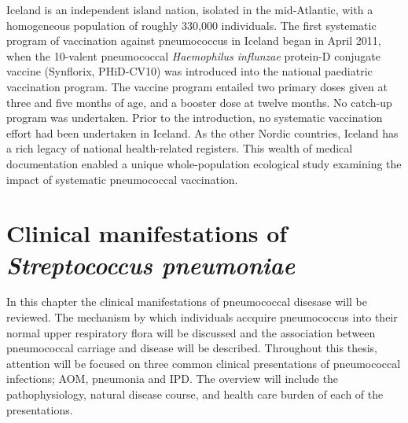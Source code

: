 \documentclass[]{book}
\theoremstyle{definition}
\theoremstyle{definition}
\theoremstyle{definition}
\theoremstyle{remark}
\begin{document}
Iceland is an independent island nation, isolated in the mid-Atlantic,
with a homogeneous population of roughly 330,000 individuals. The first
systematic program of vaccination against pneumococcus in Iceland began
in April 2011, when the 10-valent pneumococcal \emph{Haemophilus
influnzae} protein-D conjugate vaccine (Synflorix, PHiD-CV10) was
introduced into the national paediatric vaccination program. The vaccine
program entailed two primary doses given at three and five months of
age, and a booster dose at twelve months. No catch-up program was
undertaken. Prior to the introduction, no systematic vaccination effort
had been undertaken in Iceland. As the other Nordic countries, Iceland
has a rich legacy of national health-related registers. This wealth of
medical documentation enabled a unique whole-population ecological study
examining the impact of systematic pneumococcal vaccination.

\section{\texorpdfstring{Clinical manifestations of \emph{Streptococcus
pneumoniae}}{Clinical manifestations of Streptococcus pneumoniae}}\label{clinical-manifestations-of-streptococcus-pneumoniae}

In this chapter the clinical manifestations of pneumococcal disesase
will be reviewed. The mechanism by which individuals accquire
pneumococcus into their normal upper respiratory flora will be discussed
and the association between pneumococcal carriage and disease will be
described. Throughout this thesis, attention will be focused on three
common clinical presentations of pneumococcal infections; AOM, pneumonia
and IPD. The overview will include the pathophysiology, natural disease
course, and health care burden of each of the presentations.
\end{document}
